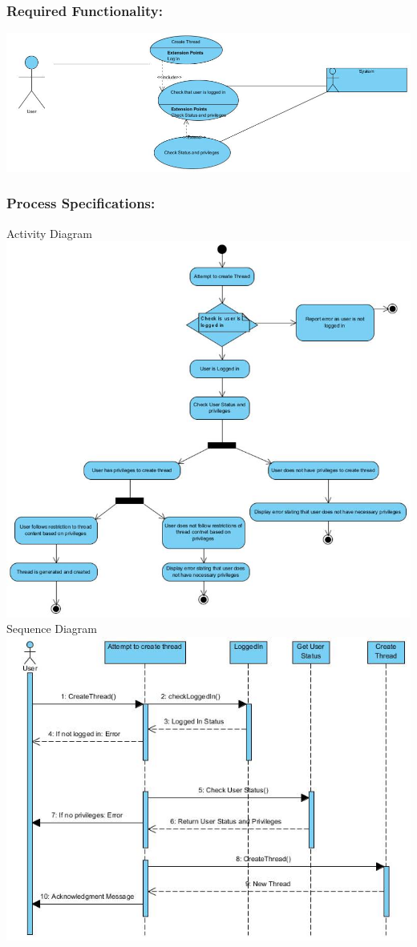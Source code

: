 \documentclass[a4paper,11pt]{article}
\begin{document}
\subsubsection{Required Functionality:} 
\includegraphics[width=1\linewidth]{./Images/CRUDThread/Diagrams/2.jpg}
\subsubsection{Process Specifications:} 
Activity Diagram\\
\includegraphics[width=1\linewidth]{./Images/CRUDThread/Diagrams/3.jpg}
\newpage
Sequence Diagram\\
\includegraphics[width=1\linewidth]{./Images/CRUDThread/Diagrams/4.jpg}\\
\end{document}
